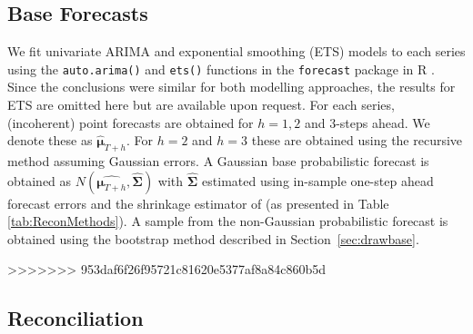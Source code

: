 \documentclass[12pt]{article}
\theoremstyle{definition}
\begin{document}
\subsection{Base Forecasts}

We fit univariate ARIMA and exponential smoothing (ETS) models to each series using the \verb|auto.arima()| and \verb|ets()| functions in the \verb|forecast| package \citep{Rforecast} in R \citep{Rcore}.  Since the conclusions were similar for both modelling approaches, the results for ETS are omitted here but are available upon request.  For each series, (incoherent) point forecasts are obtained for $h = 1, 2$ and $3$-steps ahead.  We denote these as $\hat{\bm\mu}_{T+h}$. For $h=2$ and $h=3$ these are obtained using the recursive method \citep{FPP2018} assuming Gaussian errors.  A Gaussian base probabilistic forecast is obtained as $N(\hat{\bm{\mu}_{T+h}},\hat{\bm{\Sigma}})$ with $\hat{\bm{\Sigma}}$ estimated using in-sample one-step ahead forecast errors and the shrinkage estimator of \citet{Schafer2005} (as presented in Table \ref{tab:ReconMethods}).  A sample from the non-Gaussian probabilistic forecast is obtained using the bootstrap method described in Section~\ref{sec:drawbase}.

>>>>>>> 953daf6f26f95721c81620e5377af8a84c860b5d
\subsection{Reconciliation}
\end{document}
